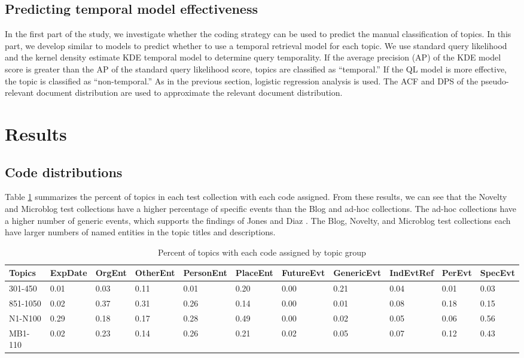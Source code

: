 \documentclass{sig-alternate}
\begin{document}
\subsection{Predicting temporal model effectiveness}
In the first part of the study, we investigate whether the coding strategy can be used to predict the manual classification of topics.  In this part, we develop similar to models to predict whether to use a temporal retrieval model for each topic. We use standard query likelihood \cite{XXX} and the kernel density estimate {KDE} temporal model \cite{Efron2014} to determine query temporality. If the average precision (AP) of the KDE model score is greater than the AP of the standard query likelihood score, topics are classified as ``temporal.''  If the QL model is more effective, the topic is classified as ``non-temporal.'' As in the previous section, logistic regression analysis is used.  The ACF and DPS of the pseudo-relevant document distribution are used to approximate the relevant document distribution.

\section{Results}

\subsection{Code distributions}

Table \ref{table.codedist} summarizes the percent of topics in each test collection with each code assigned. From these results, we can see that the Novelty and Microblog test collections have a higher percentage of specific events than the Blog and ad-hoc collections. The ad-hoc collections have a higher number of generic events, which supports the findings of Jones and Diaz \cite{Jones2007}. The Blog, Novelty, and Microblog test collections each have larger numbers of named entities in the topic titles and descriptions.

\begin{table}
\small
\begin{tabular}{| l | l | l | l | l | l | l | l | l | l | l |} \hline
Topics & ExpDate &	OrgEnt&	OtherEnt&	PersonEnt&	PlaceEnt&	FutureEvt&	GenericEvt&	IndEvtRef &	PerEvt&	SpecEvt \\ \hline
301-450	&	0.01&	0.03&	0.11&	0.01&	0.20&	0.00&	0.21&	0.04&	0.01&	0.03 \\ \hline
851-1050	&	0.02&	0.37&	0.31&	0.26&	0.14&	0.00&	0.01&	0.08&	0.18&	0.15 \\ \hline
N1-N100	&	0.29&	0.18&	0.17&	0.28&	0.49&	0.00&	0.02&	0.05&	0.06&	0.56 \\ \hline
MB1-110	&	0.02&	0.23&	0.14&	0.26&	0.21&	0.02&	0.05&	0.07&	0.12&	0.43 \\ \hline
\end{tabular}
\caption{Percent of topics with each code assigned by topic group}
\label{table.codedist}
\end{table}
\end{document}
